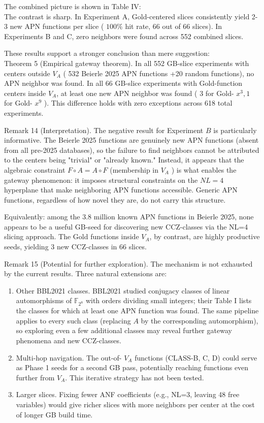 \documentclass[10pt]{article}
\begin{document}
The combined picture is shown in Table IV:\\
The contrast is sharp. In Experiment A, Gold-centered slices consistently yield 2-3 new APN functions per slice ( $100 \%$ hit rate, 66 out of 66 slices). In Experiments B and C, zero neighbors were found across 552 combined slices.

These results support a stronger conclusion than mere suggestion:\\
Theorem 5 (Empirical gateway theorem). In all 552 GB-slice experiments with centers outside $V_{A}$ ( 532 Beierle 2025 APN functions +20 random functions), no APN neighbor was found. In all 66 GB-slice experiments with Gold-function centers inside $V_{A}$, at least one new APN neighbor was found ( 3 for Gold- $x^{3}, 1$ for Gold- $x^{9}$ ). This difference holds with zero exceptions across 618 total experiments.

Remark 14 (Interpretation). The negative result for Experiment $B$ is particularly informative. The Beierle 2025 functions are genuinely new APN functions (absent from all pre-2025 databases), so the failure to find neighbors cannot be attributed to the centers being "trivial" or "already known." Instead, it appears that the algebraic constraint $F \circ A=A \circ F$ (membership in $V_{A}$ ) is what enables the gateway phenomenon: it imposes structural constraints on the $N L=4$ hyperplane that make neighboring APN functions accessible. Generic APN functions, regardless of how novel they are, do not carry this structure.

Equivalently: among the 3.8 million known APN functions in Beierle 2025, none appears to be a useful GB-seed for discovering new CCZ-classes via the NL=4 slicing approach. The Gold functions inside $V_{A}$, by contrast, are highly productive seeds, yielding 3 new CCZ-classes in 66 slices.

Remark 15 (Potential for further exploration). The mechanism is not exhausted by the current results. Three natural extensions are:

\begin{enumerate}
  \item Other BBL2021 classes. BBL2021 studied conjugacy classes of linear automorphisms of $\mathbb{F}_{2^{8}}$ with orders dividing small integers; their Table I lists the classes for which at least one APN function was found. The same pipeline applies to every such class (replacing $A$ by the corresponding automorphism), so exploring even a few additional classes may reveal further gateway phenomena and new CCZ-classes.
  \item Multi-hop navigation. The out-of- $V_{A}$ functions (CLASS-B, C, D) could serve as Phase 1 seeds for a second GB pass, potentially reaching functions even further from $V_{A}$. This iterative strategy has not been tested.
  \item Larger slices. Fixing fewer ANF coefficients (e.g., NL=3, leaving 48 free variables) would give richer slices with more neighbors per center at the cost of longer GB build time.
\end{enumerate}
\end{document}
